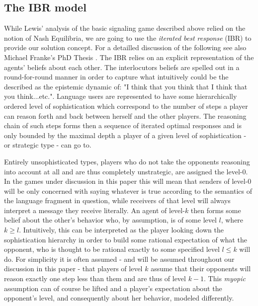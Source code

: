 \documentclass{article}
\begin{document}
\subsection{The IBR model}
While Lewis' analysis of the basic signaling game described above relied on the notion of Nash Equilibria, we are going to use the \textit{iterated best response} (IBR) to provide our solution concept. For a detailled discussion of the following see also Michael Franke's PhD Thesis \cite{franke2009signal}. The IBR relies on an explicit representation of the agents' beliefs about each other. The interlocutors beliefs are spelled out in a round-for-round manner in order to capture what intuitively could be the described as the epistemic dynamic of: "I think that you think that I think that you think...etc.". Language users are represented to have some hierarchically ordered level of sophistication which correspond to the number of steps a player can reason forth and back between herself and the other players. The reasoning chain of such steps forms then a sequence of iterated optimal responses and is only bounded by the maximal depth a player of a given level of sophistication - or strategic type - can go to. 

Entirely unsophisticated types, players who do not take the opponents reasoning into account at all and are thus completely unstrategic, are assigned the level-0. In the games under discussion in this paper this will mean that senders of level-0 will be only concerned with saying whatever is true according to the semantics of the language fragment in question, while receivers of that level will always interpret a message they receive literally. An agent of level-$k$ then forms some belief about the other's behavior who, by assumption, is of some level $l$, where $k\geq l$. Intuitively, this can be interpreted as the player looking down the sophistication hierarchy in order to build some rational expectation of what the opponent, who is thought to be rational exactly to some specified level $l\leq k$ will do. For simplicity it is often assumed - and will be assumed throughout our discussion in this paper - that players of level $k$ assume that their opponents will reason exactly one step less than them and are thus of level $k-1$. This \textit{myopic} assumption can of course be lifted and a player's expectation about the opponent's level, and consequently about her behavior, modeled differently.
\end{document}

